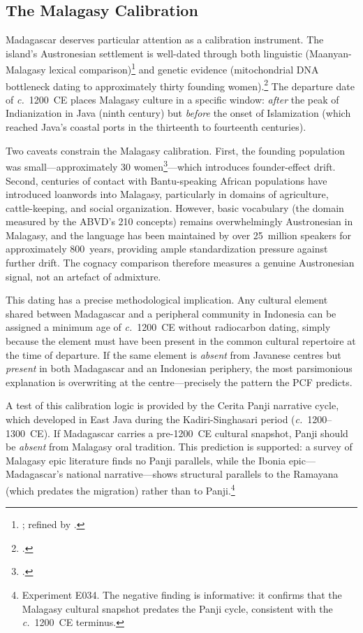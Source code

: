 \documentclass[12pt,a4paper]{article}
\begin{document}
\subsection{The Malagasy Calibration}

Madagascar deserves particular attention as a calibration instrument. The island's Austronesian settlement is well-dated through both linguistic (Maanyan-Malagasy lexical comparison)\footnote{\autocite{dahl1951malgache}; refined by \autocite{adelaar2005malayo}.} and genetic evidence (mitochondrial DNA bottleneck dating to approximately thirty founding women).\footnote{\autocite{cox2012small}.} The departure date of \textit{c.}~1200~CE places Malagasy culture in a specific window: \emph{after} the peak of Indianization in Java (ninth century) but \emph{before} the onset of Islamization (which reached Java's coastal ports in the thirteenth to fourteenth centuries).

Two caveats constrain the Malagasy calibration. First, the founding population was small---approximately 30 women\footnote{\autocite{cox2012small}.}---which introduces founder-effect drift. Second, centuries of contact with Bantu-speaking African populations have introduced loanwords into Malagasy, particularly in domains of agriculture, cattle-keeping, and social organization. However, basic vocabulary (the domain measured by the ABVD's 210 concepts) remains overwhelmingly Austronesian in Malagasy, and the language has been maintained by over 25~million speakers for approximately 800~years, providing ample standardization pressure against further drift. The cognacy comparison therefore measures a genuine Austronesian signal, not an artefact of admixture.

This dating has a precise methodological implication. Any cultural element shared between Madagascar and a peripheral community in Indonesia can be assigned a minimum age of \textit{c.}~1200~CE without radiocarbon dating, simply because the element must have been present in the common cultural repertoire at the time of departure. If the same element is \emph{absent} from Javanese centres but \emph{present} in both Madagascar and an Indonesian periphery, the most parsimonious explanation is overwriting at the centre---precisely the pattern the PCF predicts.

A test of this calibration logic is provided by the Cerita Panji narrative cycle, which developed in East Java during the Kadiri-Singhasari period (\textit{c.}~1200--1300~CE). If Madagascar carries a pre-1200~CE cultural snapshot, Panji should be \emph{absent} from Malagasy oral tradition. This prediction is supported: a survey of Malagasy epic literature finds no Panji parallels, while the Ibonia epic---Madagascar's national narrative---shows structural parallels to the Ramayana (which predates the migration) rather than to Panji.\footnote{Experiment E034. The negative finding is informative: it confirms that the Malagasy cultural snapshot predates the Panji cycle, consistent with the \textit{c.}~1200~CE terminus.}
\end{document}
